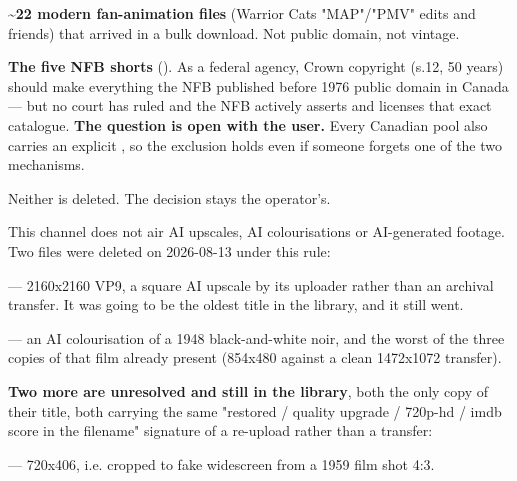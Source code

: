 \documentclass[fontpath=fonts/,logopath=logo/]{riposte-doc}
\begin{document}
\begin{ripbullets}
\item \textbf{\textasciitilde{}22 modern fan-animation files} (Warrior Cats "MAP"/"PMV" edits and friends) that arrived in a bulk download. Not public domain, not vintage.
\item \textbf{The five NFB shorts} (). As a federal agency, Crown copyright (s.12, 50 years) should make everything the NFB published before 1976 public domain in Canada — but no court has ruled and the NFB actively asserts and licenses that exact catalogue. \textbf{The question is open with the user.} Every Canadian pool also carries an explicit , so the exclusion holds even if someone forgets one of the two mechanisms.
\end{ripbullets}

Neither is deleted. The decision stays the operator's.



This channel does not air AI upscales, AI colourisations or AI-generated footage. Two files were deleted on 2026-08-13 under this rule:

\begin{ripbullets}
\item {} — 2160x2160 VP9, a square AI upscale by its uploader rather than an archival transfer. It was going to be the oldest title in the library, and it still went.
\item {} — an AI colourisation of a 1948 black-and-white noir, and the worst of the three copies of that film already present (854x480 against a clean 1472x1072 transfer).
\end{ripbullets}

\textbf{Two more are unresolved and still in the library}, both the only copy of their title, both carrying the same "restored / quality upgrade / 720p-hd / imdb score in the filename" signature of a re-upload rather than a transfer:

\begin{ripbullets}
\item {}
\item {} — 720x406, i.e. cropped to fake widescreen from a 1959 film shot 4:3.
\end{ripbullets}
\end{document}
